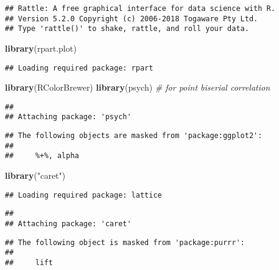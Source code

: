 \documentclass[]{article}
\newenvironment{Shaded}{\begin{snugshade}}{\end{snugshade}}
\newcommand{\KeywordTok}[1]{\textcolor[rgb]{0.13,0.29,0.53}{\textbf{#1}}}
\newcommand{\StringTok}[1]{\textcolor[rgb]{0.31,0.60,0.02}{#1}}
\newcommand{\CommentTok}[1]{\textcolor[rgb]{0.56,0.35,0.01}{\textit{#1}}}
\newcommand{\NormalTok}[1]{#1}
\begin{document}
\begin{verbatim}
## Rattle: A free graphical interface for data science with R.
## Version 5.2.0 Copyright (c) 2006-2018 Togaware Pty Ltd.
## Type 'rattle()' to shake, rattle, and roll your data.
\end{verbatim}

\begin{Shaded}
\begin{Highlighting}[]
\KeywordTok{library}\NormalTok{(rpart.plot)}
\end{Highlighting}
\end{Shaded}

\begin{verbatim}
## Loading required package: rpart
\end{verbatim}

\begin{Shaded}
\begin{Highlighting}[]
\KeywordTok{library}\NormalTok{(RColorBrewer)}
\KeywordTok{library}\NormalTok{(psych) }\CommentTok{# for point biserial correlation}
\end{Highlighting}
\end{Shaded}

\begin{verbatim}
## 
## Attaching package: 'psych'
\end{verbatim}

\begin{verbatim}
## The following objects are masked from 'package:ggplot2':
## 
##     %+%, alpha
\end{verbatim}

\begin{Shaded}
\begin{Highlighting}[]
\KeywordTok{library}\NormalTok{(}\StringTok{"caret"}\NormalTok{)}
\end{Highlighting}
\end{Shaded}

\begin{verbatim}
## Loading required package: lattice
\end{verbatim}

\begin{verbatim}
## 
## Attaching package: 'caret'
\end{verbatim}

\begin{verbatim}
## The following object is masked from 'package:purrr':
## 
##     lift
\end{verbatim}
\end{document}
